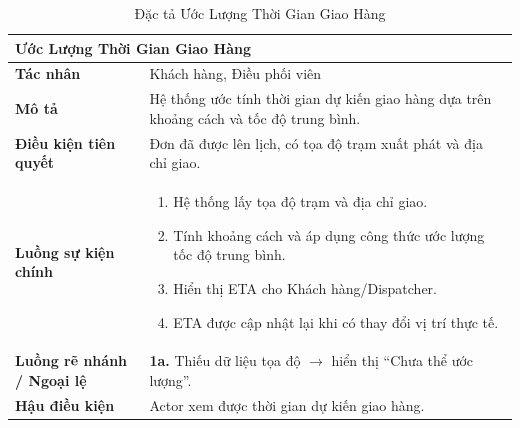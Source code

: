 \begin{table}[H]
  \centering
  \begin{tabularx}{\textwidth}{|l|X|}
    \hline
    \multicolumn{2}{|l|}{\textbf{Ước Lượng Thời Gian Giao Hàng}} \\
    \hline
    \textbf{Tác nhân}           & Khách hàng, Điều phối viên \\ \hline
    \textbf{Mô tả}              & Hệ thống ước tính thời gian dự kiến giao hàng dựa trên khoảng cách và tốc độ trung bình. \\ \hline
    \textbf{Điều kiện tiên quyết} & Đơn đã được lên lịch, có tọa độ trạm xuất phát và địa chỉ giao. \\ \hline
    \textbf{Luồng sự kiện chính} &
      \begin{enumerate}[leftmargin=*, nosep, topsep=0pt]
        \item Hệ thống lấy tọa độ trạm và địa chỉ giao.
        \item Tính khoảng cách và áp dụng công thức ước lượng tốc độ trung bình.
        \item Hiển thị ETA cho Khách hàng/Dispatcher.
        \item ETA được cập nhật lại khi có thay đổi vị trí thực tế.
      \end{enumerate} \\ \hline
    \textbf{Luồng rẽ nhánh / Ngoại lệ} &
      \textbf{1a.} Thiếu dữ liệu tọa độ $\rightarrow$ hiển thị ``Chưa thể ước lượng''. \\ \hline
    \textbf{Hậu điều kiện}      & Actor xem được thời gian dự kiến giao hàng. \\
    \hline
  \end{tabularx}
  \caption{Đặc tả Ước Lượng Thời Gian Giao Hàng}
  \label{tab:uc10}
\end{table}


